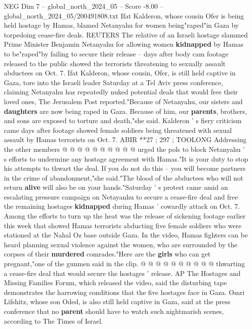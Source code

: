 \begin{textsample}{NEG Dim 7 – global\_north\_2024\_05 – Score -8.00 – global\_north\_2024\_05/200491808.txt}  \label{ex:f7_neg_188}
Ifat Kalderon, whose cousin Ofer is being held hostage by Hamas, blamed Netanyahu for women being"raped"in Gaza by torpedoing cease-fire deals.
REUTERS The relative of an Israeli hostage slammed Prime Minister Benjamin Netanyahu for allowing women \textbf{kidnapped} by Hamas to be"raped"by failing to secure their release -- days after body cam footage released to the public showed the terrorists threatening to sexually assault abductees on Oct. 7.
Ifat Kalderon, whose cousin, Ofer, is still held captive in Gaza, tore into the Israeli leader Saturday at a Tel Aviv press conference, claiming Netanyahu has repeatedly nuked potential deals that would free their loved ones, The Jerusalem Post reported."Because of Netanyahu, our sisters and \textbf{daughters} are now being raped in Gaza.
Because of him, our \textbf{parents}, brothers, and sons are exposed to torture and death,"she said.
Kalderon ' s fiery criticism came days after footage showed female soldiers being threatened with sexual assault by Hamas terrorists on Oct. 7.
ABIR **27 ; 297 ; TOOLONG Addressing the other members @ @ @ @ @ @ @ @ @ @ urged the pols to block Netanyahu ' s efforts to undermine any hostage agreement with Hamas."It is your duty to stop his attempts to thwart the deal.
If you do not do this -- you will become partners in the crime of abandonment,"she said."The blood of the abductees who will not return \textbf{alive} will also be on your hands."Saturday ' s protest came amid an escalating pressure campaign on Netayanhu to secure a cease-fire deal and free the remaining hostages \textbf{kidnapped} during Hamas ' cowardly attack on Oct. 7.
Among the efforts to turn up the heat was the release of sickening footage earlier this week that showed Hamas terrorists abducting five female soldiers who were stationed at the Nahal Oz base outside Gaza.
In the video, Hamas fighters can be heard planning sexual violence against the women, who are surrounded by the corpses of their \textbf{murdered} comrades."Here are the \textbf{girls} who can get pregnant,"one of the gunmen said in the clip. @ @ @ @ @ @ @ @ @ @ thwarting a cease-fire deal that would secure the hostages ' release.
AP The Hostages and Missing Families Forum, which released the video, said the disturbing tape demonstrates the harrowing conditions that the five hostages face in Gaza.
Omri Lifshitz, whose son Oded, is also still held captive in Gaza, said at the press conference that no \textbf{parent} should have to watch such nightmarish scenes, according to The Times of Israel.

\end{textsample}
